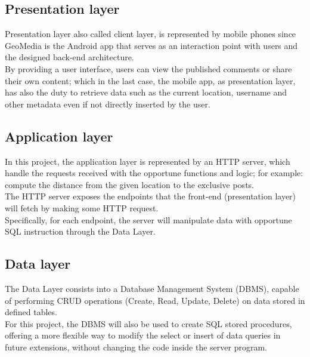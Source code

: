 \documentclass[conference]{IEEEtran}
\begin{document}
\subsection{Presentation layer}
Presentation layer also called client layer, is represented by mobile phones since GeoMedia is the Android app that serves as an interaction point with users and the designed back-end architecture.
\\
By providing a user interface, users can view the published comments or share their own content; which in the last case, the mobile app, as presentation layer, has also the duty to retrieve data such as the current location, username and other metadata even if not directly inserted by the user.
\subsection{Application layer}

In this project, the application layer is represented by an HTTP server, which handle the requests received with the opportune functions and logic; for example: compute the distance from the given location to the exclusive posts.
\\
The HTTP server exposes the endpoints that the front-end (presentation layer) will fetch by making some HTTP request.
\\
Specifically, for each endpoint, the server will manipulate data with opportune SQL instruction through the Data Layer.

\subsection{Data layer}

The Data Layer consists into a Database Management System (DBMS), capable of performing CRUD operations (Create, Read, Update, Delete) on data stored in defined tables.
\\
For this project, the DBMS will also be used to create SQL stored procedures, offering a more flexible way to modify the select or insert of data queries in future extensions, without changing the code inside the server program.
\end{document}
